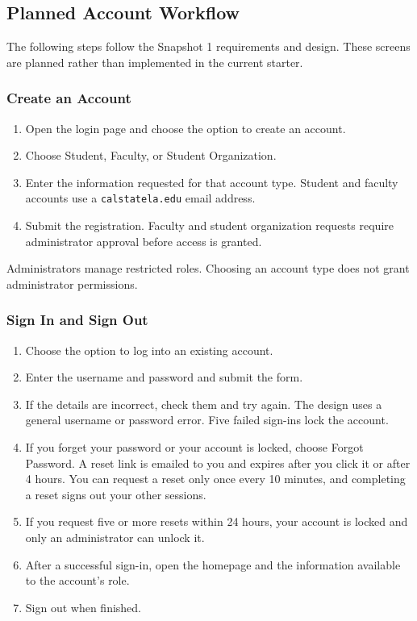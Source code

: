 	\subsection{Planned Account Workflow}
		The following steps follow the Snapshot 1 requirements and design. These screens are planned rather than implemented in the current starter.

	\subsubsection{Create an Account}
		\begin{enumerate}[label=\arabic*.]
			\item Open the login page and choose the option to create an account.
			\item Choose Student, Faculty, or Student Organization.
			\item Enter the information requested for that account type. Student and faculty accounts use a \texttt{calstatela.edu} email address.
			\item Submit the registration. Faculty and student organization requests require administrator approval before access is granted.
		\end{enumerate}
	Administrators manage restricted roles. Choosing an account type does not grant administrator permissions.

	\subsubsection{Sign In and Sign Out}
		\begin{enumerate}[label=\arabic*.]
			\item Choose the option to log into an existing account.
			\item Enter the username and password and submit the form.
			\item If the details are incorrect, check them and try again. The design uses a general username or password error. Five failed sign-ins lock the account.
		\item If you forget your password or your account is locked, choose Forgot Password. A reset link is emailed to you and expires after you click it or after 4 hours. You can request a reset only once every 10 minutes, and completing a reset signs out your other sessions.
		\item If you request five or more resets within 24 hours, your account is locked and only an administrator can unlock it.
			\item After a successful sign-in, open the homepage and the information available to the account's role.
			\item Sign out when finished.
		\end{enumerate}

